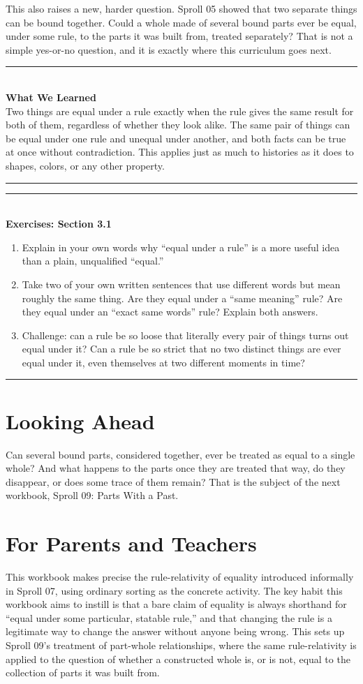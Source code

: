 \documentclass[11pt]{book}
\newenvironment{exercisebox}[1]{\vspace{0.8em}\noindent\rule{\linewidth}{0.6pt}\\[0.2em]\textbf{Exercises: #1}\\[0.3em]\begin{enumerate}[label=\arabic*., itemsep=0.4em]}{\end{enumerate}\noindent\rule{\linewidth}{0.6pt}\vspace{0.6em}}
\newenvironment{summarybox}{\vspace{0.6em}\noindent\rule{\linewidth}{0.6pt}\\[0.2em]\textbf{What We Learned}\\[0.3em]}{\\[0.2em]\noindent\rule{\linewidth}{0.6pt}\vspace{0.6em}}
\begin{document}
This also raises a new, harder question. Sproll 05 showed that two separate things can be bound together. Could a whole made of several bound parts ever be equal, under some rule, to the parts it was built from, treated separately? That is not a simple yes-or-no question, and it is exactly where this curriculum goes next.

\begin{summarybox}
Two things are equal under a rule exactly when the rule gives the same result for both of them, regardless of whether they look alike. The same pair of things can be equal under one rule and unequal under another, and both facts can be true at once without contradiction. This applies just as much to histories as it does to shapes, colors, or any other property.
\end{summarybox}

\begin{exercisebox}{Section 3.1}
\item Explain in your own words why ``equal under a rule'' is a more useful idea than a plain, unqualified ``equal.''
\item Take two of your own written sentences that use different words but mean roughly the same thing. Are they equal under a ``same meaning'' rule? Are they equal under an ``exact same words'' rule? Explain both answers.
\item Challenge: can a rule be so loose that literally every pair of things turns out equal under it? Can a rule be so strict that no two distinct things are ever equal under it, even themselves at two different moments in time?
\end{exercisebox}

\chapter*{Looking Ahead}

Can several bound parts, considered together, ever be treated as equal to a single whole? And what happens to the parts once they are treated that way, do they disappear, or does some trace of them remain? That is the subject of the next workbook, Sproll 09: Parts With a Past.

\chapter*{For Parents and Teachers}

This workbook makes precise the rule-relativity of equality introduced informally in Sproll 07, using ordinary sorting as the concrete activity. The key habit this workbook aims to instill is that a bare claim of equality is always shorthand for ``equal under some particular, statable rule,'' and that changing the rule is a legitimate way to change the answer without anyone being wrong. This sets up Sproll 09's treatment of part-whole relationships, where the same rule-relativity is applied to the question of whether a constructed whole is, or is not, equal to the collection of parts it was built from.
\end{document}
